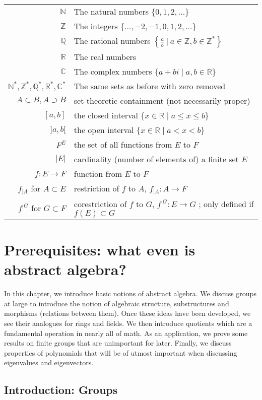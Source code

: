 \documentclass{book}
\newcommand{\N}{\mathbb{N}}
\newcommand{\Z}{\mathbb{Z}}
\newcommand{\Q}{\mathbb{Q}}
\newcommand{\R}{\mathbb{R}}
\newcommand{\C}{\mathbb{C}}
\theoremstyle{plain}
\theoremstyle{definition}
\theoremstyle{remark}
\begin{document}
\renewcommand{\arraystretch}{1.2}
\begin{tabular}{rp{}}
  $\N$ & The natural numbers $\{0,1,2,\dots\}$ \\
  $\Z$ & The integers $\{\dots,-2,-1,0,1,2,\dots\}$ \\
  $\Q$ & The rational numbers $\left\{\frac{a}{b} \: \Big| \: a \in \Z, b \in \Z^* \right\}$ \\
  $\R$ & The real numbers \\
  $\C$ & The complex numbers $\{a+bi \mid a,b \in \R\}$ \\
  $\N^*,\Z^*, \Q^*, \R^*, \C^*$ & The same sets as before with zero removed \\
  $A \subset B, A \supset B$ & set-theoretic containment (not necessarily proper) \\
  $[a,b]$ & the closed interval $\{x \in \R \mid a \le x \le b\}$\\
  $]a,b[$ & the open interval $\{x \in \R \mid a < x < b\}$ \\
  $F^E$ & the set of all functions from $E$ to $F$ \\
  $|E|$ & cardinality (number of elements of) a finite set $E$ \\
  $f : E \to F$ & function from $E$ to $F$ \\
  $f_{\mid A}$ for $A \subset E$ & restriction of $f$ to $A$, $f_{\mid A} : A \to F$ \\
  $f^{\mid G}$ for $G \subset F$ & corestriction of $f$ to $G$, $f^{\mid G} : E \to G$ ; only defined if $f(E) \subset G$
\end{tabular}


\chapter{Prerequisites: what even is abstract algebra?}

In this chapter, we introduce basic notions of abstract algebra. We discuss groups at large to introduce the notion of algebraic structure, substructures and morphisms (relations between them). Once these ideas have been developed, we see their analogues for rings and fields. We then introduce quotients which are a fundamental operation in nearly all of math. As an application, we prove some results on finite groups that are unimportant for later. Finally, we discuss properties of polynomials that will be of utmost important when discussing eigenvalues and eigenvectors.

\section{Introduction: Groups}
\end{document}
